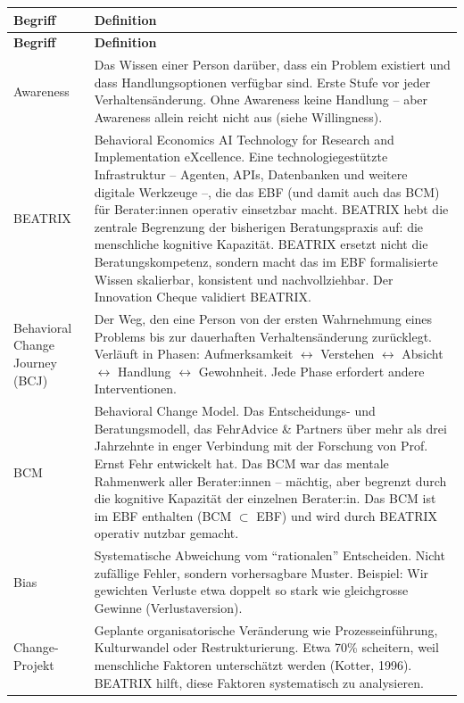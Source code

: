 \documentclass[11pt,a4paper]{article}
\begin{document}
\begin{longtable}{@{}L{4cm}L{10cm}@{}}
\toprule
\textbf{Begriff} & \textbf{Definition} \\
\midrule
\endfirsthead
\toprule
\textbf{Begriff} & \textbf{Definition} \\
\midrule
\endhead

Awareness & Das Wissen einer Person darüber, dass ein Problem existiert und dass Handlungsoptionen verfügbar sind. Erste Stufe vor jeder Verhaltensänderung. Ohne Awareness keine Handlung -- aber Awareness allein reicht nicht aus (siehe Willingness). \\
\midrule
BEATRIX & Behavioral Economics AI Technology for Research and Implementation eXcellence. Eine technologiegestützte Infrastruktur -- Agenten, APIs, Datenbanken und weitere digitale Werkzeuge --, die das EBF (und damit auch das BCM) für Berater:innen operativ einsetzbar macht. BEATRIX hebt die zentrale Begrenzung der bisherigen Beratungspraxis auf: die menschliche kognitive Kapazität. BEATRIX ersetzt nicht die Beratungskompetenz, sondern macht das im EBF formalisierte Wissen skalierbar, konsistent und nachvollziehbar. Der Innovation Cheque validiert BEATRIX. \\
\midrule
Behavioral Change Journey (BCJ) & Der Weg, den eine Person von der ersten Wahrnehmung eines Problems bis zur dauerhaften Verhaltensänderung zurücklegt. Verläuft in Phasen: Aufmerksamkeit $\leftrightarrow$ Verstehen $\leftrightarrow$ Absicht $\leftrightarrow$ Handlung $\leftrightarrow$ Gewohnheit. Jede Phase erfordert andere Interventionen. \\
\midrule
BCM & Behavioral Change Model. Das Entscheidungs- und Beratungsmodell, das FehrAdvice \& Partners über mehr als drei Jahrzehnte in enger Verbindung mit der Forschung von Prof. Ernst Fehr entwickelt hat. Das BCM war das mentale Rahmenwerk aller Berater:innen -- mächtig, aber begrenzt durch die kognitive Kapazität der einzelnen Berater:in. Das BCM ist im EBF enthalten (BCM $\subset$ EBF) und wird durch BEATRIX operativ nutzbar gemacht. \\
\midrule
Bias & Systematische Abweichung vom ``rationalen'' Entscheiden. Nicht zufällige Fehler, sondern vorhersagbare Muster. Beispiel: Wir gewichten Verluste etwa doppelt so stark wie gleichgrosse Gewinne (Verlustaversion). \\
\midrule
Change-Projekt & Geplante organisatorische Veränderung wie Prozesseinführung, Kulturwandel oder Restrukturierung. Etwa 70\% scheitern, weil menschliche Faktoren unterschätzt werden (Kotter, 1996). BEATRIX hilft, diese Faktoren systematisch zu analysieren. \\

\end{longtable}
\end{document}

